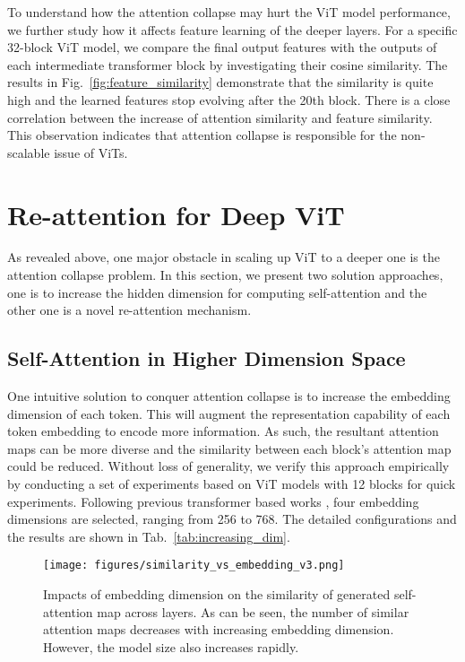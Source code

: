 \documentclass[10pt,twocolumn,letterpaper]{article}
\newcommand{\nameofatten}{Re-attention}
\begin{document}
To understand how the  attention collapse may hurt the ViT model performance, we further  study how it affects feature learning of the deeper layers. 
{For a specific 32-block ViT model, we compare the final output features  with the outputs of  each intermediate transformer block  by investigating their cosine similarity. The results in Fig.~\ref{fig:feature_similarity}  demonstrate that the similarity is quite high and the  learned features stop evolving 
after the 20th block. There is a close correlation between the increase of attention similarity and feature similarity.} 
This observation indicates that attention collapse is responsible for the non-scalable issue of ViTs.











\section{\nameofatten{} for Deep ViT}

As revealed above, one major obstacle in scaling up ViT to a deeper one is the attention
collapse problem. In this section, we present two solution approaches, one is to increase the hidden dimension for computing self-attention and the other one is a novel re-attention mechanism. 

\subsection{Self-Attention in Higher Dimension Space}
One intuitive solution to conquer attention collapse is to increase the embedding dimension of each token. This will augment the representation capability of each token embedding to encode more information. As such, the resultant attention maps can be more diverse and the similarity between each block's attention map could be reduced. {Without loss of generality, we verify this approach empirically by conducting a set of experiments based on ViT models with 12 blocks for quick experiments.} 
Following previous transformer based works \cite{vaswani2017attention,dosovitskiy2020image}, four embedding dimensions are selected,  ranging from 256 to 768.  The detailed configurations and the results are shown in Tab.~\ref{tab:increasing_dim}. 

\begin{figure}[t] 
\begin{center}
\texttt{[image: figures/similarity\_vs\_embedding\_v3.png]}
\end{center}
\vspace{-15pt}
  \caption{Impacts of embedding dimension on the similarity of generated self-attention map across layers. As can be seen, the number of similar attention maps decreases with increasing embedding dimension. However, the model size also increases rapidly. 
}
\label{fig:similar_block_vs_embedding}
\end{figure}
\end{document}
